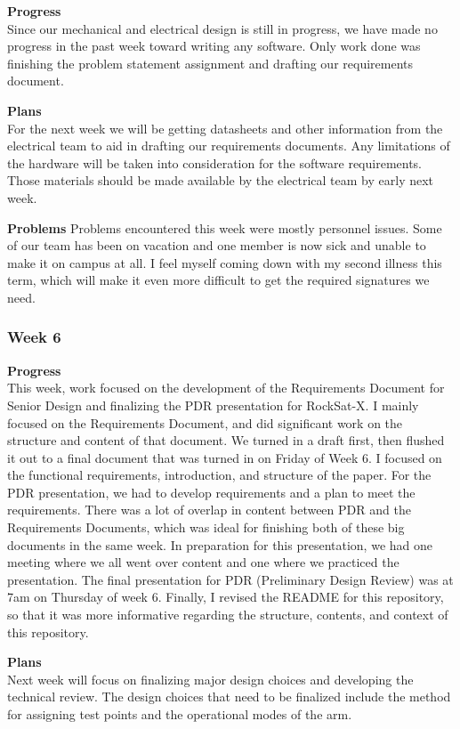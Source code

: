 \textbf{Progress} \\
Since our mechanical and electrical design is still in progress, we have made no progress in the past week toward writing any software. Only work done was finishing the problem statement assignment and drafting our requirements document.

\textbf{Plans} \\
For the next week we will be getting datasheets and other information from the electrical team to aid in drafting our requirements documents. Any limitations of the hardware will be taken into consideration for the software requirements. Those materials should be made available by the electrical team by early next week.

\textbf{Problems}
Problems encountered this week were mostly personnel issues. Some of our team has been on vacation and one member is now sick and unable to make it on campus at all. I feel myself coming down with my second illness this term, which will make it even more difficult to get the required signatures we need.

\subsubsection{Week 6}
\textbf{Progress} \\
This week, work focused on the development of the Requirements Document for Senior Design and finalizing the PDR presentation for RockSat-X. I mainly focused on the Requirements Document, and did significant work on the structure and content of that document. We turned in a draft first, then flushed it out to a final document that was turned in on Friday of Week 6. I focused on the functional requirements, introduction, and structure of the paper. For the PDR presentation, we had to develop requirements and a plan to meet the requirements. There was a lot of overlap in content between PDR and the Requirements Documents, which was ideal for finishing both of these big documents in the same week. In preparation for this presentation, we had one meeting where we all went over content and one where we practiced the presentation. The final presentation for PDR (Preliminary Design Review) was at 7am on Thursday of week 6. Finally, I revised the README for this repository, so that it was more informative regarding the structure, contents, and context of this repository.

\textbf{Plans} \\
Next week will focus on finalizing major design choices and developing the technical review. The design choices that need to be finalized include the method for assigning test points and the operational modes of the arm.

